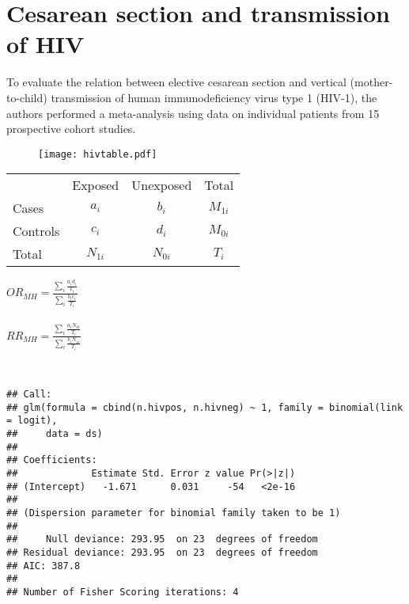 \documentclass[landscape,twocolumn,letterpaper,9pt,reqno]{article}\usepackage[]{graphicx}\usepackage[]{color}
\newenvironment{knitrout}{}{} %
\begin{document}
	


\section{Cesarean section and transmission of HIV}

\vspace{-0.1in}

To evaluate the relation between elective cesarean section and vertical (mother-to-child) transmission of human immunodeficiency virus type 1 (HIV-1), the authors performed a meta-analysis using data on individual patients from 15 prospective cohort studies.

\begin{figure}[h]
	\centering
	\texttt{[image: hivtable.pdf]}
\end{figure}




\begin{table}[H]
	\centering
	\begin{tabular}{lcc|c}
			     & Exposed  &   Unexposed & Total  \\		
		Cases    & $a_i$ &  $b_i$ & $M_{1i}$ \\
		Controls & $c_i$ 	& $d_i$  	& $M_{0i}$ 	\\	
		\hline
		Total & $N_{1i}$ & $N_{0i}$ 	& $T_i$
	\end{tabular}
\end{table}


$OR_{MH} = \frac{\sum_i \frac{a_i d_i}{T_i}}{\sum_i \frac{b_i c_i}{T_i}}$ \\ \ \\
$RR_{MH} = \frac{\sum_i \frac{a_i N_{0i}}{T_i}}{\sum_i \frac{b_i N_{1i}}{T_i}}$

\clearpage

\textcolor{white}{text}

\clearpage

\begin{knitrout}\small
{}\color{fgcolor}
\begin{verbatim}
## Call:
## glm(formula = cbind(n.hivpos, n.hivneg) ~ 1, family = binomial(link = logit), 
##     data = ds)
## 
## Coefficients:
##             Estimate Std. Error z value Pr(>|z|)
## (Intercept)   -1.671      0.031     -54   <2e-16
## 
## (Dispersion parameter for binomial family taken to be 1)
## 
##     Null deviance: 293.95  on 23  degrees of freedom
## Residual deviance: 293.95  on 23  degrees of freedom
## AIC: 387.8
## 
## Number of Fisher Scoring iterations: 4
\end{verbatim}

\end{knitrout}
\end{document}
